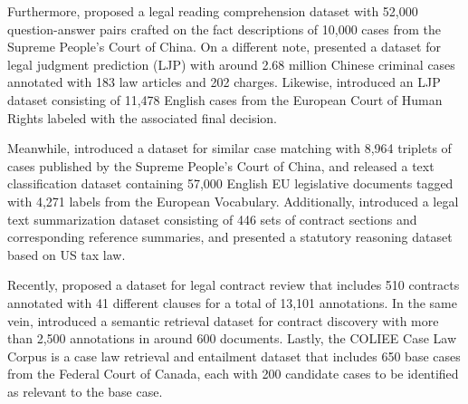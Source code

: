 \documentclass[11pt]{article}
\begin{document}
Furthermore, \citet{duan2019cjrc} proposed a legal reading comprehension dataset with 52,000 question-answer pairs crafted on the fact descriptions of 10,000 cases from the Supreme People’s Court of China. On a different note, \citet{xiao2018large} presented a dataset for legal judgment prediction (LJP) with around 2.68 million Chinese criminal cases annotated with 183 law articles and 202 charges. Likewise, \citet{chalkidis2019neural} introduced an LJP dataset consisting of 11,478 English cases from the European Court of Human Rights labeled with the associated final decision. 

Meanwhile, \citet{xiao2019dataset} introduced a dataset for similar case matching with 8,964 triplets of cases published by the Supreme People’s Court of China, and \citet{chalkidis2019large} released a text classification dataset containing 57,000 English EU legislative documents tagged with 4,271 labels from the European Vocabulary. Additionally, \citet{manor2019plain} introduced a legal text summarization dataset consisting of 446 sets of contract sections and corresponding reference  summaries, and \citet{holzenberger2020dataset} presented a statutory reasoning dataset based on US tax law. 

Recently, \citet{hendrycks2021cuad} proposed a dataset for legal contract review that includes 510 contracts annotated with 41 different clauses for a total of 13,101 annotations. In the same vein, \citet{borchmann2020contract} introduced a semantic retrieval dataset for contract discovery with more than 2,500 annotations in around 600 documents. Lastly, the COLIEE Case Law Corpus \citep{rabelo2020coliee} is a case law retrieval and entailment dataset that includes 650 base cases from the Federal Court of Canada, each with 200 candidate cases to be identified as relevant to the base case.
\end{document}
